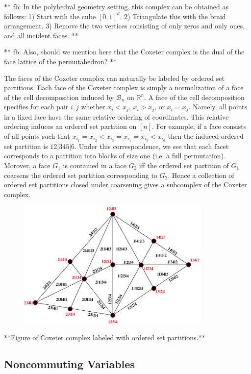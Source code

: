 \documentclass[12pt]{amsart}
\begin{document}
** fb: In the polyhedral geometry setting, this complex
can be obtained as follows: 1) Start with the cube $[0,1]^d$. 2) Triangulate 
this with the braid arrangement. 3) Remove the two vertices consisting of 
only zeros and only ones, and all incident faces. **

** fb: Also, should we mention here that the Coxeter complex is the dual of the face lattice of the permutahedron? **

The faces of the Coxeter complex can naturally be labeled by ordered
set partitions.  Each face of the Coxeter complex is simply a
normalization of a face of the cell decomposition induced by
$\mathcal{B}_n$ on $\mathbb{R}^n$.  A face of the cell decomposition specifies for each pair $i,j$ whether $x_i < x_j$, $x_i > x_j$, or $x_i = x_j$.  Namely, all points in a fixed face have
the same relative ordering of coordinates.  This relative ordering
induces an ordered set partition on $[n]$.  For example, if a face
consists of all points such that $x_{i_1} = x_{i_2} < x_{i_3} =
x_{i_4} = x_{i_5} < x_{i_6}$ then the induced ordered set partition is
$12|345|6$.  Under this correspondence, we see that each facet
corresponds to a partition into blocks of size one (i.e. a full
permutation).  Morover, a face $G_1$ is contained in a face $G_2$ iff
the ordered set partition of $G_1$ coarsens the ordered set partition
corresponding to $G_2$.  Hence a collection of ordered set partitions
closed under coarsening gives a subcomplex of the Coxeter complex.

\begin{figure}
\includegraphics[height=2.5in]{Cox.pdf}
\end{figure}


**Figure of Coxeter complex labeled with ordered set partitions.**

\subsection{Noncommuting Variables}
\end{document}
